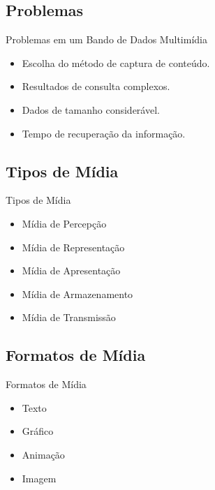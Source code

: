 \documentclass{beamer}
\begin{document}
    \subsection{Problemas}

        \begin{frame}{Problemas em um Bando de Dados Multimídia}
            \begin{itemize}
                \item Escolha do método de captura de conteúdo.
                \item Resultados de consulta complexos.
                \item Dados de tamanho considerável.
                \item Tempo de recuperação da informação.
            \end{itemize}
        \end{frame}
    
    \subsection{Tipos de Mídia}
    
    \begin{frame}{Tipos de Mídia}
        \begin{itemize}
            \item Mídia de Percepção
            \item Mídia de Representação
            \item Mídia de Apresentação
            \item Mídia de Armazenamento
            \item Mídia de Transmissão
        \end{itemize}
        
    \end{frame}
    
    \subsection{Formatos de Mídia}
    
    \begin{frame}{Formatos de Mídia}
        \begin{itemize}
                \item Texto
                \item Gráfico
                \item Animação
                \item Imagem
            \end{itemize}
    
    \end{frame}
\end{document}
